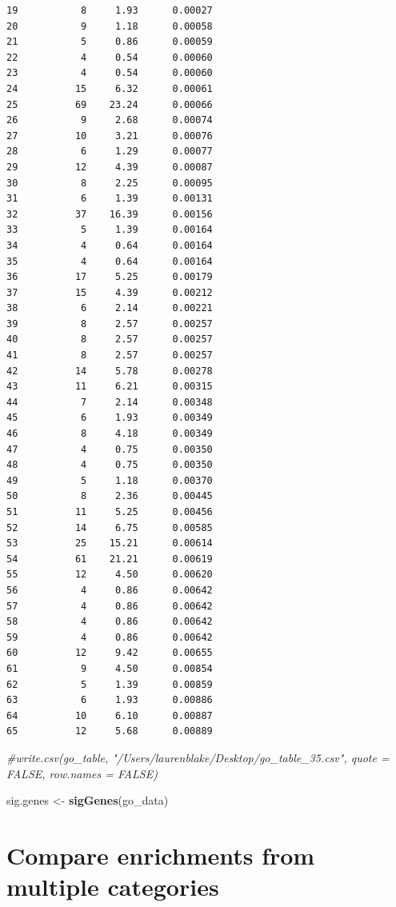 \documentclass[]{article}
\newenvironment{Shaded}{\begin{snugshade}}{\end{snugshade}}
\newcommand{\KeywordTok}[1]{\textcolor[rgb]{0.13,0.29,0.53}{\textbf{#1}}}
\newcommand{\StringTok}[1]{\textcolor[rgb]{0.31,0.60,0.02}{#1}}
\newcommand{\CommentTok}[1]{\textcolor[rgb]{0.56,0.35,0.01}{\textit{#1}}}
\newcommand{\NormalTok}[1]{#1}
\begin{document}
\begin{verbatim}
19           8     1.93      0.00027
20           9     1.18      0.00058
21           5     0.86      0.00059
22           4     0.54      0.00060
23           4     0.54      0.00060
24          15     6.32      0.00061
25          69    23.24      0.00066
26           9     2.68      0.00074
27          10     3.21      0.00076
28           6     1.29      0.00077
29          12     4.39      0.00087
30           8     2.25      0.00095
31           6     1.39      0.00131
32          37    16.39      0.00156
33           5     1.39      0.00164
34           4     0.64      0.00164
35           4     0.64      0.00164
36          17     5.25      0.00179
37          15     4.39      0.00212
38           6     2.14      0.00221
39           8     2.57      0.00257
40           8     2.57      0.00257
41           8     2.57      0.00257
42          14     5.78      0.00278
43          11     6.21      0.00315
44           7     2.14      0.00348
45           6     1.93      0.00349
46           8     4.18      0.00349
47           4     0.75      0.00350
48           4     0.75      0.00350
49           5     1.18      0.00370
50           8     2.36      0.00445
51          11     5.25      0.00456
52          14     6.75      0.00585
53          25    15.21      0.00614
54          61    21.21      0.00619
55          12     4.50      0.00620
56           4     0.86      0.00642
57           4     0.86      0.00642
58           4     0.86      0.00642
59           4     0.86      0.00642
60          12     9.42      0.00655
61           9     4.50      0.00854
62           5     1.39      0.00859
63           6     1.93      0.00886
64          10     6.10      0.00887
65          12     5.68      0.00889
\end{verbatim}

\begin{Shaded}
\begin{Highlighting}[]
\CommentTok{#write.csv(go_table, "/Users/laurenblake/Desktop/go_table_35.csv", quote = FALSE, row.names = FALSE)}

\NormalTok{sig.genes <-}\StringTok{ }\KeywordTok{sigGenes}\NormalTok{(go_data)}
\end{Highlighting}
\end{Shaded}

\section{Compare enrichments from multiple
categories}\label{compare-enrichments-from-multiple-categories}
\end{document}

